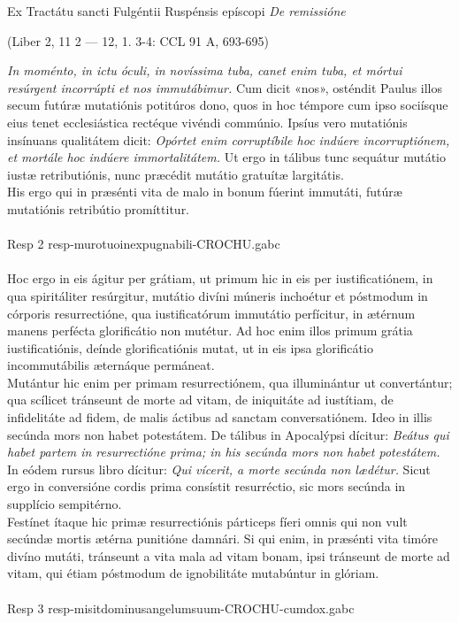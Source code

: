 \documentclass[options]{article}
\begin{document}
	Ex Tractátu sancti Fulgéntii Ruspénsis epíscopi \emph{De remissióne}
	\begin{flushright}
		(Liber 2, 11 2 — 12, 1. 3-4: CCL 91 A, 693-695)
	\end{flushright}
\emph{In moménto, in ictu óculi, in novíssima tuba, canet enim tuba, et mórtui resúrgent incorrúpti et nos immutábimur.} Cum dicit «nos», osténdit Paulus illos secum futúræ mutatiónis potitúros dono, quos in hoc témpore cum ipso sociísque eius tenet ecclesiástica rectéque vivéndi commúnio. Ipsíus vero mutatiónis insínuans qualitátem dicit: \emph{Opórtet enim corruptíbile hoc indúere incorruptiónem, et mortále hoc indúere immortalitátem.} Ut ergo in tálibus tunc sequátur mutátio iustæ retributiónis, nunc præcédit mutátio gratuítæ largitátis.\\
 His ergo qui in præsénti vita de malo in bonum fúerint immutáti, futúræ mutatiónis retribútio promíttitur.\\
 \\
 Resp 2  resp-murotuoinexpugnabili-CROCHU.gabc\\
 \\
  Hoc ergo in eis ágitur per grátiam, ut primum hic in eis per iustificatiónem, in qua spiritáliter resúrgitur, mutátio divíni múneris inchoétur et póstmodum in córporis resurrectióne, qua iustificatórum immutátio perfícitur, in ætérnum manens perfécta glorificátio non mutétur. Ad hoc enim illos primum grátia iustificatiónis, deínde glorificatiónis mutat, ut in eis ipsa glorificátio incommutábilis æternáque permáneat.\\
   Mutántur hic enim per primam resurrectiónem, qua illuminántur ut convertántur; qua scílicet tránseunt de morte ad vitam, de iniquitáte ad iustítiam, de infidelitáte ad fidem, de malis áctibus ad sanctam conversatiónem. Ideo in illis secúnda mors non habet potestátem. De tálibus in Apocalýpsi dícitur: \emph{Beátus qui habet partem in resurrectióne prima; in his secúnda mors non habet potestátem.} In eódem rursus libro dícitur: \emph{Qui vícerit, a morte secúnda non lædétur.} Sicut ergo in conversióne cordis prima consístit resurréctio, sic mors secúnda in supplício sempitérno.\\
    Festínet ítaque hic primæ resurrectiónis párticeps fíeri omnis qui non vult secúndæ mortis ætérna punitióne damnári. Si qui enim, in præsénti vita timóre divíno mutáti, tránseunt a vita mala ad vitam bonam, ipsi tránseunt de morte ad vitam, qui étiam póstmodum de ignobilitáte mutabúntur in glóriam.\\
    \\
    Resp 3 resp-misitdominusangelumsuum-CROCHU-cumdox.gabc
 
\end{document}
